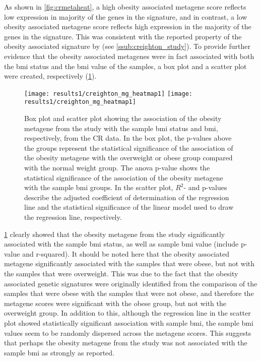As shown in \cref{fig:crmetaheat}, a high obesity associated metagene score  reflects low expression in majority of the genes in the signature, and in contrast, a low obesity associated metagene score reflects high expression in the majority of the genes in the signature.
This was consistent with the reported property of the obesity associated signature by \citet{Creighton2012} (see \cref{ssub:creighton_study}).
To provide further evidence that the obesity associated metagenes were in fact associated with both the \gls{bmi} status and the \gls{bmi} value of the samples, a box plot and a scatter plot were created, respectively (\cref{fig:crmetaboxplot}).

\begin{figure}[htp!]
	\centering
	\texttt{[image: results1/creighton\_mg\_heatmap1]}
	\hfill
	\texttt{[image: results1/creighton\_mg\_heatmap1]}
	\caption[Obesity metagene from the \citet{Creighton2012} study and sample \gls{bmi}/\gls{bmi} status in CR data]{Box plot and scatter plot showing the association of the obesity metagene from the \citet{Creighton2012} study with the sample \gls{bmi} status and \gls{bmi}, respectively, from the CR data.
	In the box plot, the p-values above the groups represent the statistical significance of the association of the obesity metagene with the overweight or obese group compared with the normal weight group.
	The \gls{anova} p-value shows the statistical significance of the association of the obesity metagene with the sample \gls{bmi} groups.
	In the scatter plot, $R^2$- and p-values describe the adjusted coefficient of determination of the regression line and the statistical significance of the linear model used to draw the regression line, respectively.}
	\label{fig:crmetaboxplot}
\end{figure}

\cref{fig:crmetaboxplot} clearly showed that the obesity metagene from the \citet{Creighton2012} study significantly associated with the sample \gls{bmi} status, as well as sample \gls{bmi} value (include p-value and r-squared).
It should be noted here that the obesity associated metagene significantly associated with the samples that were obese, but not with the samples that were overweight.
This was due to the fact that the obesity associated genetic signatures were originally identified from the comparison of the samples that were obese with the samples that were not obese, and therefore the metagene scores were significant with the obese group, but not with the overweight group.
In addition to this, although the regression line in the scatter plot showed statistically significant association with sample \gls{bmi}, the sample \gls{bmi} values seem to be randomly dispersed across the metagene scores.
This suggests that perhaps the obesity metagene from the \citet{Creighton2012} study was not associated with the sample \gls{bmi} as strongly as reported.
\\

